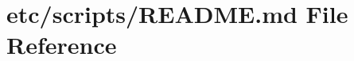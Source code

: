 \hypertarget{etc_2scripts_2README_8md}{}\section{etc/scripts/\+R\+E\+A\+D\+ME.md File Reference}
\label{etc_2scripts_2README_8md}
